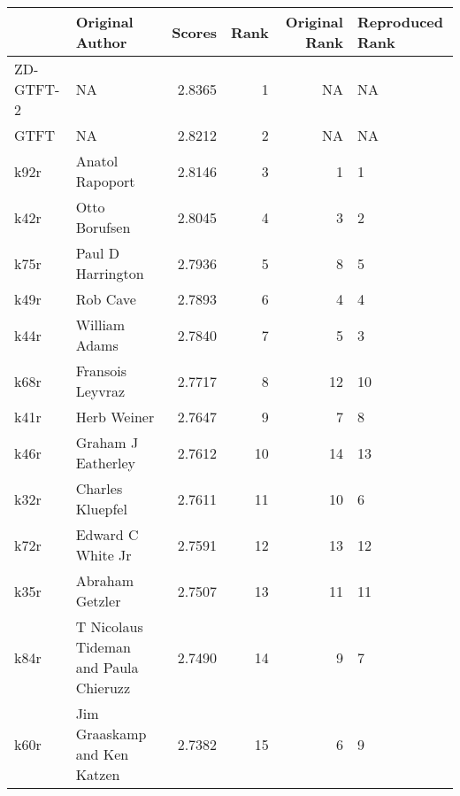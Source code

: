 \begin{tabular}{llrrrl}
\toprule
{} &                        Original Author &  Scores &  Rank &  Original Rank & Reproduced Rank \\
\midrule
ZD-GTFT-2 &                                     NA &  2.8365 &     1 &             NA &              NA \\
GTFT      &                                     NA &  2.8212 &     2 &             NA &              NA \\
k92r      &                        Anatol Rapoport &  2.8146 &     3 &              1 &               1 \\
k42r      &                          Otto Borufsen &  2.8045 &     4 &              3 &               2 \\
k75r      &                      Paul D Harrington &  2.7936 &     5 &              8 &               5 \\
k49r      &                               Rob Cave &  2.7893 &     6 &              4 &               4 \\
k44r      &                          William Adams &  2.7840 &     7 &              5 &               3 \\
k68r      &                       Fransois Leyvraz &  2.7717 &     8 &             12 &              10 \\
k41r      &                            Herb Weiner &  2.7647 &     9 &              7 &               8 \\
k46r      &                     Graham J Eatherley &  2.7612 &    10 &             14 &              13 \\
k32r      &                       Charles Kluepfel &  2.7611 &    11 &             10 &               6 \\
k72r      &                      Edward C White Jr &  2.7591 &    12 &             13 &              12 \\
k35r      &                        Abraham Getzler &  2.7507 &    13 &             11 &              11 \\
k84r      &  T Nicolaus Tideman and Paula Chieruzz &  2.7490 &    14 &              9 &               7 \\
k60r      &           Jim Graaskamp and Ken Katzen &  2.7382 &    15 &              6 &               9 \\
\bottomrule
\end{tabular}
